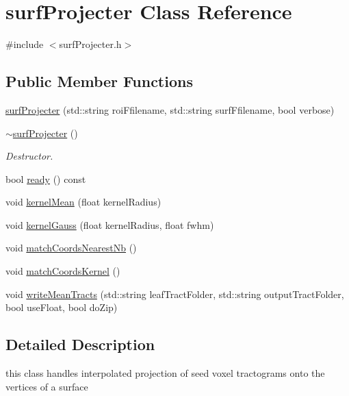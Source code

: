 \hypertarget{classsurfProjecter}{\section{surf\-Projecter \-Class \-Reference}
\label{classsurfProjecter}
}


{\ttfamily \#include $<$surf\-Projecter.\-h$>$}

\subsection*{\-Public \-Member \-Functions}
\begin{DoxyCompactItemize}
\item 
\hyperlink{classsurfProjecter_aec2b59072ce649a26d1a5068b83a9b5b}{surf\-Projecter} (std\-::string roi\-Ffilename, std\-::string surf\-Ffilename, bool verbose)
\item 
\hypertarget{classsurfProjecter_af895337c197a14c4c144125ac2cffb91}{\hyperlink{classsurfProjecter_af895337c197a14c4c144125ac2cffb91}{$\sim$surf\-Projecter} ()}\label{classsurfProjecter_af895337c197a14c4c144125ac2cffb91}

\begin{DoxyCompactList}\small\item\em \-Destructor. \end{DoxyCompactList}\item 
bool \hyperlink{classsurfProjecter_ae71a3a413bcfa21f70f55a1164ac9fd8}{ready} () const 
\item 
void \hyperlink{classsurfProjecter_acc9a0f76e6c6a8199953fbc32c3283a9}{kernel\-Mean} (float kernel\-Radius)
\item 
void \hyperlink{classsurfProjecter_a1870b362e8534e10750d294bd5f14192}{kernel\-Gauss} (float kernel\-Radius, float fwhm)
\item 
void \hyperlink{classsurfProjecter_afec5301cbf1eaa73889465b7f027c1ae}{match\-Coords\-Nearest\-Nb} ()
\item 
void \hyperlink{classsurfProjecter_af7d99090148eca1dbb368fa799a4fcb9}{match\-Coords\-Kernel} ()
\item 
void \hyperlink{classsurfProjecter_a01884b8446a1c67dc4dd75473637c4be}{write\-Mean\-Tracts} (std\-::string leaf\-Tract\-Folder, std\-::string output\-Tract\-Folder, bool use\-Float, bool do\-Zip)
\end{DoxyCompactItemize}


\subsection{\-Detailed \-Description}
this class handles interpolated projection of seed voxel tractograms onto the vertices of a surface 

